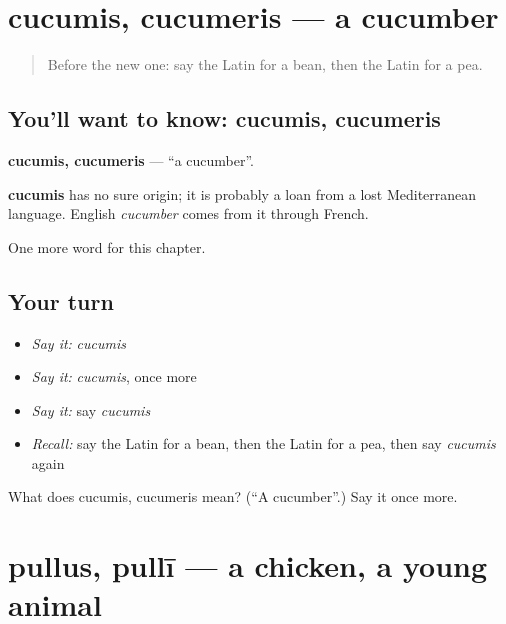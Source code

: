 \section[cucumis, cucumeris]{cucumis, cucumeris — a cucumber}

\label{lesson:LA-C127-cucumis}



\begin{quote}
Before the new one: say the Latin for a bean, then the Latin for a pea.
\end{quote}

\subsection*{You'll want to know: cucumis, cucumeris}
\textbf{cucumis, cucumeris} — \textquotedblleft{}a cucumber\textquotedblright{}.

\begin{cousinweb}
\textbf{cucumis} has no sure origin; it is probably a loan from a lost Mediterranean language. English \emph{cucumber} comes from it through French.
\end{cousinweb}

\begin{grammarlens}[title={What you've built}]
One more word for this chapter.
\end{grammarlens}

\subsection*{Your turn}
\begin{itemize}
\raggedright
  \item \emph{Say it:} \emph{cucumis}
  \item \emph{Say it:} \emph{cucumis}, once more
  \item \emph{Say it:} say \emph{cucumis}
  \item \emph{Recall:} say the Latin for a bean, then the Latin for a pea, then say \emph{cucumis} again
\end{itemize}

\begin{tcolorbox}[breakable,colback=teal!4,colframe=teal!35!black,title={Before you move on}]
What does cucumis, cucumeris mean? (\textquotedblleft{}A cucumber\textquotedblright{}.) Say it once more.
\end{tcolorbox}
\section[pullus, pullī]{pullus, pullī — a chicken, a young animal}

